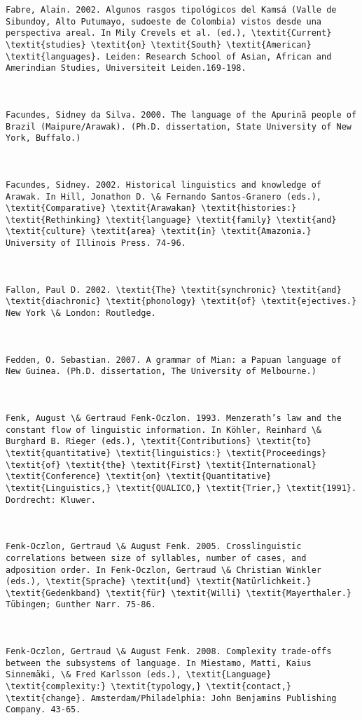 \begin{verbatim}
Fabre, Alain. 2002. Algunos rasgos tipológicos del Kamsá (Valle de Sibundoy, Alto Putumayo, sudoeste de Colombia) vistos desde una perspectiva areal. In Mily Crevels et al. (ed.), \textit{Current} \textit{studies} \textit{on} \textit{South} \textit{American} \textit{languages}. Leiden: Research School of Asian, African and Amerindian Studies, Universiteit Leiden.169-198.



Facundes, Sidney da Silva. 2000. The language of the Apurinã people of Brazil (Maipure/Arawak). (Ph.D. dissertation, State University of New York, Buffalo.)



Facundes, Sidney. 2002. Historical linguistics and knowledge of Arawak. In Hill, Jonathon D. \& Fernando Santos-Granero (eds.), \textit{Comparative} \textit{Arawakan} \textit{histories:} \textit{Rethinking} \textit{language} \textit{family} \textit{and} \textit{culture} \textit{area} \textit{in} \textit{Amazonia.} University of Illinois Press. 74-96.



Fallon, Paul D. 2002. \textit{The} \textit{synchronic} \textit{and} \textit{diachronic} \textit{phonology} \textit{of} \textit{ejectives.} New York \& London: Routledge.



Fedden, O. Sebastian. 2007. A grammar of Mian: a Papuan language of New Guinea. (Ph.D. dissertation, The University of Melbourne.)



Fenk, August \& Gertraud Fenk-Oczlon. 1993. Menzerath’s law and the constant flow of linguistic information. In Köhler, Reinhard \& Burghard B. Rieger (eds.), \textit{Contributions} \textit{to} \textit{quantitative} \textit{linguistics:} \textit{Proceedings} \textit{of} \textit{the} \textit{First} \textit{International} \textit{Conference} \textit{on} \textit{Quantitative} \textit{Linguistics,} \textit{QUALICO,} \textit{Trier,} \textit{1991}. Dordrecht: Kluwer.



Fenk-Oczlon, Gertraud \& August Fenk. 2005. Crosslinguistic correlations between size of syllables, number of cases, and adposition order. In Fenk-Oczlon, Gertraud \& Christian Winkler (eds.), \textit{Sprache} \textit{und} \textit{Natürlichkeit.} \textit{Gedenkband} \textit{für} \textit{Willi} \textit{Mayerthaler.} Tübingen; Gunther Narr. 75-86.



Fenk-Oczlon, Gertraud \& August Fenk. 2008. Complexity trade-offs between the subsystems of language. In Miestamo, Matti, Kaius Sinnemäki, \& Fred Karlsson (eds.), \textit{Language} \textit{complexity:} \textit{typology,} \textit{contact,} \textit{change}. Amsterdam/Philadelphia: John Benjamins Publishing Company. 43-65.




\end{verbatim}
